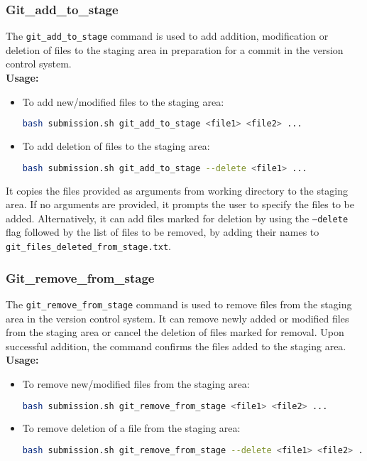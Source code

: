 \documentclass{article}
\begin{document}
\subsubsection{Git\_add\_to\_stage}
The \texttt{git\_add\_to\_stage} command is used to add addition, modification or deletion of files to the staging area in preparation for a commit in the version control system.\\
\textbf{Usage:}
\begin{itemize}
\item To add new/modified files to the staging area:
\begin{lstlisting}[language=bash]
bash submission.sh git_add_to_stage <file1> <file2> ...
\end{lstlisting}
\item To add deletion of files to the staging area:
\begin{lstlisting}[language=bash]
bash submission.sh git_add_to_stage --delete <file1> ...
\end{lstlisting}
\end{itemize}

It copies the files provided as arguments from working directory to the staging area. If no arguments are provided, it prompts the user to specify the files to be added. Alternatively, it can add files marked for deletion by using the \texttt{--delete} flag followed by the list of files to be removed, by adding their names to \texttt{git\_files\_deleted\_from\_stage.txt}. 

\subsubsection{Git\_remove\_from\_stage}
The \texttt{git\_remove\_from\_stage} command is used to remove files from the staging area in the version control system. It can remove newly added or modified files from the staging area or cancel the deletion of files marked for removal. Upon successful addition, the command confirms the files added to the staging area.\\
\textbf{Usage:}
\begin{itemize}
\item To remove new/modified files from the staging area:
\begin{lstlisting}[language=bash]
bash submission.sh git_remove_from_stage <file1> <file2> ...
\end{lstlisting}
\item To remove deletion of a file from the staging area:
\begin{lstlisting}[language=bash]
bash submission.sh git_remove_from_stage --delete <file1> <file2> ...
\end{lstlisting}
\end{itemize}
\end{document}
